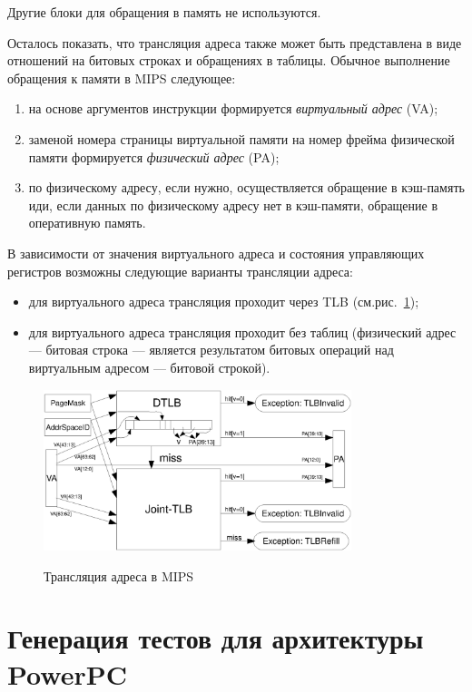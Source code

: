 \documentclass[14pt]{extreport}
\begin{document}
Другие блоки для обращения в память не используются.

Осталось показать, что трансляция адреса также может быть представлена в виде
отношений на битовых строках и обращениях в таблицы. Обычное выполнение обращения к памяти в MIPS следующее:
\begin{enumerate}
    \item на основе аргументов инструкции формируется \emph{виртуальный адрес} (VA);
    \item заменой номера страницы виртуальной памяти на номер фрейма физической памяти формируется \emph{физический адрес} (PA);
    \item по физическому адресу, если нужно, осуществляется обращение в кэш-память иди, если данных по физическому адресу нет в кэш-памяти, обращение в оперативную память.
\end{enumerate}

В зависимости от значения виртуального адреса и состояния управляющих регистров возможны следующие варианты трансляции адреса:
\begin{itemize}
  \item для виртуального адреса трансляция проходит через TLB (см.рис.~\ref{fig:mips_address_translation});
  \item для виртуального адреса трансляция проходит без таблиц (физический адрес --- битовая строка --- является результатом битовых операций над виртуальным адресом --- битовой строкой).
\end{itemize}

\begin{figure}[h] \center
  \includegraphics[width=0.8\textwidth]{4.analysis/mips_addrtrans}\\
  \caption{Трансляция адреса в MIPS}\label{fig:mips_address_translation}
\end{figure}

\section{Генерация тестов для архитектуры PowerPC}
\end{document}
